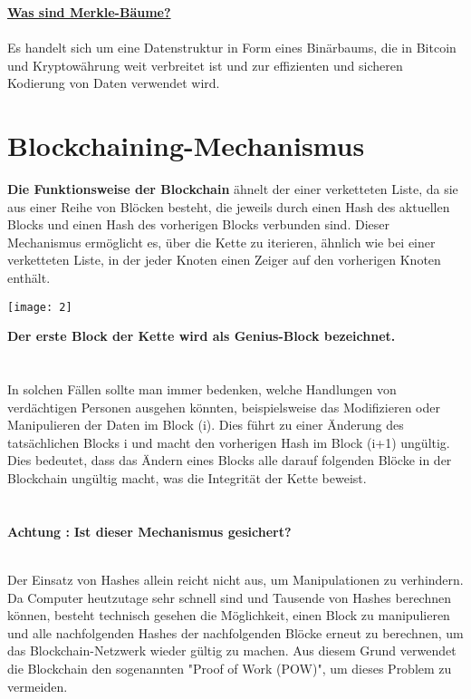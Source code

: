 \documentclass[ngerman]{scrreprt}
\begin{document}
\large
\underline{\textbf{Was sind Merkle-Bäume?}} \\ \\
\normalsize
Es handelt sich um eine Datenstruktur in Form eines Binärbaums, die in Bitcoin und Kryptowährung weit verbreitet ist und zur effizienten und sicheren Kodierung von Daten verwendet wird.




\section{Blockchaining-Mechanismus}
\textbf{Die Funktionsweise der Blockchain} ähnelt der einer verketteten Liste, da sie aus einer Reihe von Blöcken besteht, die jeweils durch einen Hash des aktuellen Blocks und einen Hash des vorherigen Blocks verbunden sind. Dieser Mechanismus ermöglicht es, über die Kette zu iterieren, ähnlich wie bei einer verketteten Liste, in der jeder Knoten einen Zeiger auf den vorherigen Knoten enthält.

\texttt{[image: 2]}


\textbf{Der erste Block der Kette wird als Genius-Block bezeichnet.} \\ \\ \\


In solchen Fällen sollte man immer bedenken, welche Handlungen von verdächtigen Personen ausgehen könnten, beispielsweise das Modifizieren oder Manipulieren der Daten im Block (i). Dies führt zu einer Änderung des tatsächlichen Blocks i und macht den vorherigen Hash im Block (i+1) ungültig. Dies bedeutet, dass das Ändern eines Blocks alle darauf folgenden Blöcke in der Blockchain ungültig macht, was die Integrität der Kette beweist.\\ \\ \\ 
\color{red}
\Large{\textbf{Achtung :}}
\color{black}
\textbf{Ist dieser Mechanismus gesichert?}\\ \\
\normalsize
 	
Der Einsatz von Hashes allein reicht nicht aus, um Manipulationen zu verhindern. Da Computer heutzutage sehr schnell sind und Tausende von Hashes berechnen können, besteht technisch gesehen die Möglichkeit, einen Block zu manipulieren und alle nachfolgenden Hashes der nachfolgenden Blöcke erneut zu berechnen, um das Blockchain-Netzwerk wieder gültig zu machen. Aus diesem Grund verwendet die Blockchain den sogenannten "Proof of Work (POW)", um dieses Problem zu vermeiden.	
\end{document}
